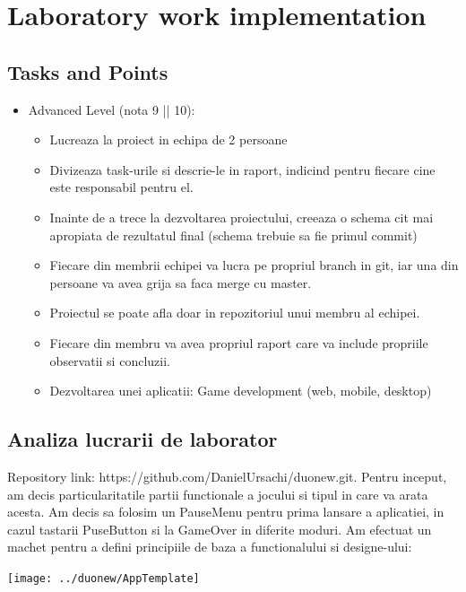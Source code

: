 \section{Laboratory work implementation}

\subsection{Tasks and Points}

\begin{itemize}

	
	\item Advanced Level (nota 9 || 10):
	\begin{itemize}
		\item Lucreaza la proiect in echipa de 2 persoane
		\item Divizeaza task-urile si descrie-le in raport, indicind pentru fiecare cine este responsabil pentru el.
		\item Inainte de a trece la dezvoltarea proiectului, creeaza o schema cit mai apropiata de rezultatul final (schema trebuie sa fie primul commit)
		\item Fiecare din membrii echipei va lucra pe propriul branch in git, iar una din persoane va avea grija sa faca merge cu master.
		\item Proiectul se poate afla doar in repozitoriul unui membru al echipei.
		\item Fiecare din membru va avea propriul raport care va include propriile observatii si concluzii.
		\item 	Dezvoltarea unei aplicatii: Game development (web, mobile, desktop)
\end{itemize}
\end{itemize}

\subsection{Analiza lucrarii de laborator}

Repository link: https://github.com/DanielUrsachi/duonew.git. 
\newline 
Pentru inceput, am decis particularitatile partii functionale a jocului si tipul in care va arata acesta. Am decis sa folosim un PauseMenu pentru prima lansare a aplicatiei, in cazul tastarii PuseButton si la GameOver in diferite moduri.
Am efectuat un machet pentru a defini principiile de baza a functionalului si designe-ului:
\begin{center}
\texttt{[image: ../duonew/AppTemplate]}
\end{center}

